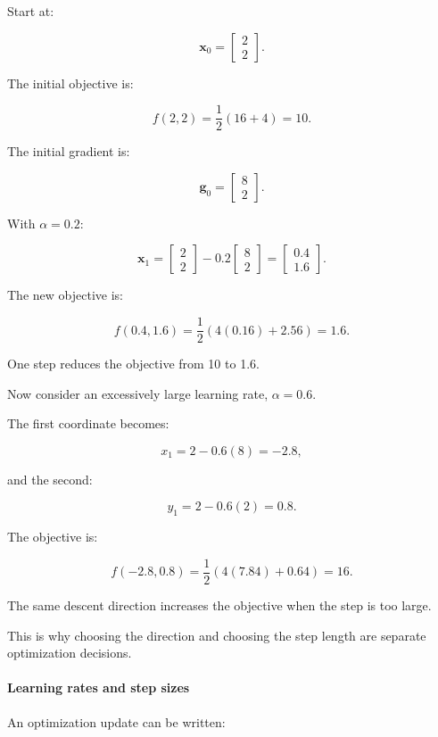 Start at:

\[
\mathbf x_0= \begin{bmatrix}2\\2\end{bmatrix}.
\]

The initial objective is:

\[
f(2,2)=\frac12(16+4)=10.
\]

The initial gradient is:

\[
\mathbf g_0= \begin{bmatrix}8\\2\end{bmatrix}.
\]

With \(\alpha=0.2\):

\[
\mathbf x_1= \begin{bmatrix}2\\2\end{bmatrix} - 0.2 \begin{bmatrix}8\\2\end{bmatrix} = \begin{bmatrix}0.4\\1.6\end{bmatrix}.
\]

The new objective is:

\[
f(0.4,1.6) = \frac12(4(0.16)+2.56) =\boxed{1.6}.
\]

One step reduces the objective from 10 to 1.6.

Now consider an excessively large learning rate, \(\alpha=0.6\).

The first coordinate becomes:

\[
x_1=2-0.6(8)=-2.8,
\]

and the second:

\[
y_1=2-0.6(2)=0.8.
\]

The objective is:

\[
f(-2.8,0.8) = \frac12(4(7.84)+0.64) =\boxed{16}.
\]

The same descent direction increases the objective when the step is too large.

This is why choosing the direction and choosing the step length are separate optimization decisions.

\paragraph{Learning rates and step sizes}\label{learning-rates-and-step-sizes}

An optimization update can be written:

